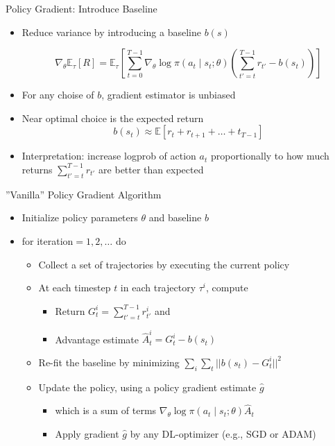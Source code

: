 \begin{frame}[c]{Policy Gradient: Introduce Baseline}
	
\begin{itemize}
	\item Reduce variance by introducing a baseline $b(s)$
	
	$$\nabla_\theta \mathbb{E}_\tau [R] = \mathbb{E}_\tau \left[ \sum_{t=0}^{T-1} \nabla_\theta \log \pi(a_t \mid s_t; \theta) \left( \sum_{t'=t}^{T-1} r_{t'} - b(s_t) \right) \right] $$
	
	\item For any choise of $b$, gradient estimator is unbiased
	\item Near optimal choice is the expected return
	$$b(s_t) \approx \mathbb{E} [r_t + r_{t+1} +\ldots + t_{T-1}] $$
	
	\item Interpretation: increase logprob of action $a_t$ proportionally to how much returns $\sum_{t'=t}^{T-1} r_{t'}$ are better than expected
	
\end{itemize}
	
	
\end{frame}
\begin{frame}[c]{”Vanilla” Policy Gradient Algorithm}
	
	\begin{itemize}
		\item Initialize policy parameters $\theta$ and baseline $b$
		\item for iteration$=1,2,\ldots$ do
		\begin{itemize}
			\item Collect a set of trajectories by executing the current policy
			\item At each timestep $t$ in each trajectory $\tau^i$, compute
			\begin{itemize}
				\item Return $G_t^i= \sum_{t'=t}^{T-1} r_{t'}^i$ and
				\item Advantage estimate $\hat{A}^i_t = G^i_t - b(s_t)$
			\end{itemize}
			\item Re-fit the baseline by minimizing $\sum_i \sum_t || b(s_t) - G^i_t||^2$
			\item Update the policy, using a policy gradient estimate $\hat{g}$
			\begin{itemize}
				\item which is a sum of terms $\nabla_\theta \log \pi(a_t \mid s_t; \theta) \hat{A}_t$
				\item Apply gradient $\hat{g}$ by any DL-optimizer (e.g., SGD or ADAM)
			\end{itemize}
		\end{itemize}
		
	\end{itemize}
	
	
\end{frame}
